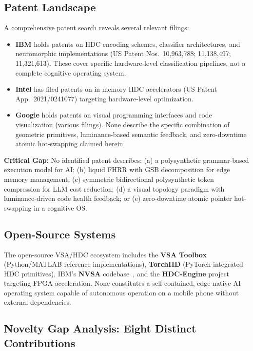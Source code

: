 \documentclass[11pt]{article}
\begin{document}
\subsection{Patent Landscape}

A comprehensive patent search reveals several relevant filings:

\begin{itemize}
    \item \textbf{IBM} holds patents on HDC encoding schemes, classifier architectures, and neuromorphic implementations (US Patent Nos.\ 10,963,788; 11,138,497; 11,321,613). These cover specific hardware-level classification pipelines, not a complete cognitive operating system.
    \item \textbf{Intel} has filed patents on in-memory HDC accelerators (US Patent App.\ 2021/0241077) targeting hardware-level optimization.
    \item \textbf{Google} holds patents on visual programming interfaces and code visualization (various filings). None describe the specific combination of geometric primitives, luminance-based semantic feedback, and zero-downtime atomic hot-swapping claimed herein.
\end{itemize}

\textbf{Critical Gap:} No identified patent describes: (a) a polysynthetic grammar-based execution model for AI; (b) liquid FHRR with GSB decomposition for edge memory management; (c) symmetric bidirectional polysynthetic token compression for LLM cost reduction; (d) a visual topology paradigm with luminance-driven code health feedback; or (e) zero-downtime atomic pointer hot-swapping in a cognitive OS.

\subsection{Open-Source Systems}

The open-source VSA/HDC ecosystem includes the \textbf{VSA Toolbox} (Python/MATLAB reference implementations), \textbf{TorchHD} (PyTorch-integrated HDC primitives), IBM's \textbf{NVSA} codebase~\cite{hersche2022nvsa}, and the \textbf{HDC-Engine} project targeting FPGA acceleration. None constitutes a self-contained, edge-native AI operating system capable of autonomous operation on a mobile phone without external dependencies.

\subsection{Novelty Gap Analysis: Eight Distinct Contributions}
\end{document}
